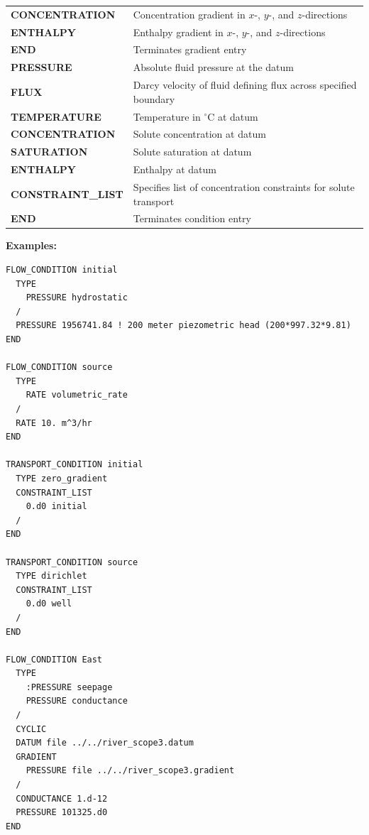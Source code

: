 \begin{center}
\begin{tabularx}{\linewidth}{lX}
\bf CONCENTRATION & Concentration gradient in $x$-, $y$-, and $z$-directions\\
\bf ENTHALPY & Enthalpy gradient in $x$-, $y$-, and $z$-directions\\
\bf END & Terminates gradient entry\\
\toprule[1.5pt]
\bf PRESSURE & Absolute fluid pressure at the datum\\
\bf FLUX & Darcy velocity of fluid defining flux across specified boundary\\
\bf TEMPERATURE & Temperature in $^\circ$C at datum\\
\bf CONCENTRATION & Solute concentration at datum\\
\bf SATURATION & Solute saturation at datum\\
\bf ENTHALPY & Enthalpy at datum\\
\bf CONSTRAINT\_LIST & Specifies list of concentration constraints for solute transport\\
\bf END & Terminates condition entry\\
\bottomrule[1.5pt]
\end{tabularx}
\end{center}

\bigskip

\begin{mdframed}

{\noindent\bf Examples:}
\footnotesize
\begin{verbatim}
FLOW_CONDITION initial
  TYPE
    PRESSURE hydrostatic
  /
  PRESSURE 1956741.84 ! 200 meter piezometric head (200*997.32*9.81)
END

FLOW_CONDITION source
  TYPE
    RATE volumetric_rate
  /
  RATE 10. m^3/hr
END

TRANSPORT_CONDITION initial
  TYPE zero_gradient
  CONSTRAINT_LIST
    0.d0 initial
  /
END

TRANSPORT_CONDITION source
  TYPE dirichlet
  CONSTRAINT_LIST
    0.d0 well
  /
END

FLOW_CONDITION East
  TYPE
    :PRESSURE seepage
    PRESSURE conductance
  /
  CYCLIC
  DATUM file ../../river_scope3.datum
  GRADIENT
    PRESSURE file ../../river_scope3.gradient
  /
  CONDUCTANCE 1.d-12
  PRESSURE 101325.d0
END
\end{verbatim}
\normalsize
\end{mdframed}

\hyperlink{target_key}{\return}


